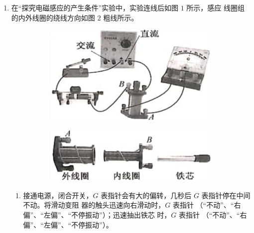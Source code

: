 



\begin{enumerate}
\item	
{}
在“探究电磁感应的产生条件”实验中，实验连线后如图 $ 1 $ 所示，感应
线圈组的内外线圈的绕线方向如图 $ 2 $ 粗线所示。
\begin{figure}[h!]
\centering
\begin{subfigure}{0.4\linewidth}
\centering
\includegraphics[width=0.87\linewidth]{picture/screenshot062}
\caption{}\label{}
\end{subfigure}
\begin{subfigure}{0.4\linewidth}
\centering
\includegraphics[width=0.8\linewidth]{picture/screenshot063}
\caption{}\label{}
\end{subfigure}
\end{figure}



\begin{enumerate}
\item
接通电源，闭合开关，$ G $ 表指针会有大的偏转，几秒后 $ G $ 表指针停在中间不动。将滑动变阻
器的触头迅速向右滑动时，$ G $ 表指针 \underlinegap （“不动”、“右偏”、“左偏”、“不停振动”）；迅速抽出铁芯
时，$ G $ 表指针 \underlinegap （“不动”、“右偏”、“左偏”、“不停振动”）。


\end{enumerate}
\end{enumerate}

